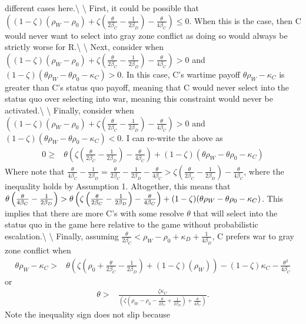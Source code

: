 \documentclass[
]{article}
\begin{document}
different cases here.\textbackslash{} \textbackslash{} First, it could
be possible that
\(\left((1-\zeta)(\rho_{W}-\rho_{0})+\zeta\left(\frac{\theta}{2\beta_{C}}-\frac{1}{2\beta_{D}}\right)-\frac{\theta}{4\beta_{C}}\right)\leq0\).
When this is the case, then C would never want to select into gray zone
conflict as doing so would always be strictly worse for
R.\textbackslash{} \textbackslash{} Next, consider when
\(\left((1-\zeta)(\rho_{W}-\rho_{0})+\zeta\left(\frac{\theta}{2\beta_{C}}-\frac{1}{2\beta_{D}}\right)-\frac{\theta}{4\beta_{C}}\right)>0\)
and \((1-\zeta)(\theta\rho_{W}-\theta\rho_{0}-\kappa_{C})>0\). In this
case, C's wartime payoff \(\theta\rho_{W}-\kappa_{C}\) is greater than
C's status quo payoff, meaning that C would never select into the status
quo over selecting into war, meaning this constraint would never be
activated.\textbackslash{} \textbackslash{} Finally, consider when
\(\left((1-\zeta)(\rho_{W}-\rho_{0})+\zeta\left(\frac{\theta}{2\beta_{C}}-\frac{1}{2\beta_{D}}\right)-\frac{\theta}{4\beta_{C}}\right)>0\)
and \((1-\zeta)(\theta\rho_{W}-\theta\rho_{0}-\kappa_{C})<0\). I can
re-write the above as \begin{align*}
0\geq & \theta\left(\zeta\left(\frac{\theta}{2\beta_{C}}-\frac{1}{2\beta_{D}}\right)-\frac{\theta}{4\beta_{C}}\right)+(1-\zeta)(\theta\rho_{W}-\theta\rho_{0}-\kappa_{C})
\end{align*} Where note that
\(\frac{\theta}{4\beta_{C}}-\frac{1}{2\beta_{D}}=\frac{\theta}{2\beta_{C}}-\frac{1}{2\beta_{D}}-\frac{\theta}{4\beta_{C}}>\zeta\left(\frac{\theta}{2\beta_{C}}-\frac{1}{2\beta_{D}}\right)-\frac{\theta}{4\beta_{C}}\),
where the inequality holds by Assumption 1. Altogether, this means that
\(\text{\ensuremath{\theta\left(\frac{\theta}{4\beta_{C}}-\frac{1}{2\beta_{D}}\right)}}>\theta\left(\zeta\left(\frac{\theta}{2\beta_{C}}-\frac{1}{2\beta_{D}}\right)-\frac{\theta}{4\beta_{C}}\right)+(1-\zeta)(\theta\rho_{W}-\theta\rho_{0}-\kappa_{C})\).
This implies that there are more C's with some resolve \(\theta\) that
will select into the status quo in the game here relative to the game
without probabilistic escalation.\textbackslash{} \textbackslash{}
Finally, assuming
\(\frac{\theta}{2\beta_{C}}<\rho_{W}-\rho_{0}+\kappa_{D}+\frac{1}{4\beta_{D}}\),
C prefers war to gray zone conflict when \begin{align*}
\theta\rho_{W}-\kappa_{C}> & \theta\left(\zeta\left(\rho_{0}+\frac{\theta}{2\beta_{C}}-\frac{1}{2\beta_{D}}\right)+(1-\zeta)\left(\rho_{W}\right)\right)-(1-\zeta)\kappa_{C}-\frac{\theta^{2}}{4\beta_{C}}
\end{align*} or \begin{align*}
\theta> & \frac{\zeta\kappa_{C}}{\left(\zeta\left(\rho_{W}-\rho_{0}-\frac{\theta}{2\beta_{C}}+\frac{1}{2\beta_{D}}\right)+\frac{\theta}{4\beta_{C}}\right)}.
\end{align*} Note the inequality sign does not slip because
\end{document}
